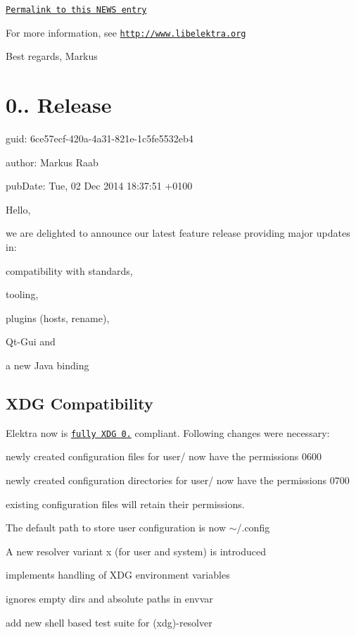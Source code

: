 \href{http://doc.libelektra.org/news/7d4647d4-4131-411e-9c2a-2aca39446e18.html}{\tt Permalink to this N\+E\+W\+S entry}

For more information, see \href{http://www.libelektra.org}{\tt http\+://www.\+libelektra.\+org}

Best regards, Markus

\section*{0.. Release}


\begin{DoxyItemize}
\item guid\+: 6ce57ecf-\/420a-\/4a31-\/821e-\/1c5fe5532eb4
\item author\+: Markus Raab
\item pub\+Date\+: Tue, 02 Dec 2014 18\+:37\+:51 +0100
\end{DoxyItemize}

Hello,

we are delighted to announce our latest feature release providing major updates in\+:


\begin{DoxyItemize}
\item compatibility with standards,
\item tooling,
\item plugins (hosts, rename),
\item Qt-\/\+Gui and
\item a new Java binding
\end{DoxyItemize}

\subsection*{X\+D\+G Compatibility}

Elektra now is \href{http://standards.freedesktop.org/basedir-spec/basedir-spec-0.8.html}{\tt fully X\+D\+G 0.} compliant. Following changes were necessary\+:


\begin{DoxyItemize}
\item newly created configuration files for user/ now have the permissions 0600
\item newly created configuration directories for user/ now have the permissions 0700
\item existing configuration files will retain their permissions.
\item The default path to store user configuration is now $\sim$/.config
\item A new resolver variant x (for user and system) is introduced
\begin{DoxyItemize}
\item implements handling of X\+D\+G environment variables
\item ignores empty dirs and absolute paths in envvar
\end{DoxyItemize}
\item add new shell based test suite for (xdg)-\/resolver
\end{DoxyItemize}

